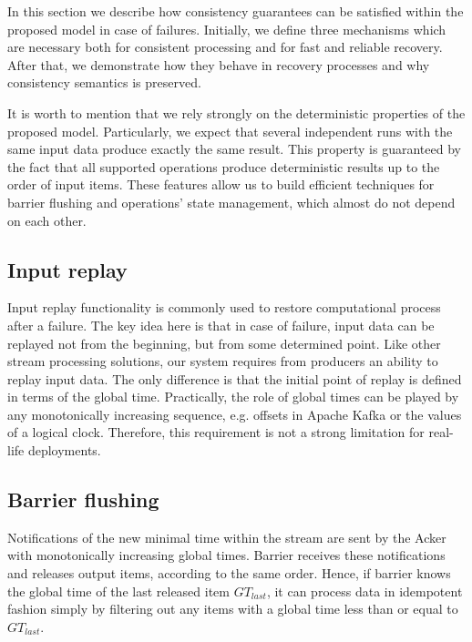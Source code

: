 
\label {fs-consistency-seciton}

In this section we describe how consistency guarantees can be satisfied within the proposed model in case of failures. Initially, we define three mechanisms which are necessary both for consistent processing and for fast and reliable recovery. After that, we demonstrate how they behave in recovery processes and why consistency semantics is preserved.

It is worth to mention that we rely strongly on the deterministic properties of the proposed model. Particularly, we expect that several independent runs with the same input data produce exactly the same result. This property is guaranteed by the fact that all supported operations produce deterministic results up to the order of input items. These features allow us to build efficient techniques for barrier flushing and operations' state management, which almost do not depend on each other.  

\subsection{Input replay}
Input replay functionality is commonly used to restore computational process after a failure. The key idea here is that in case of failure, input data can be replayed not from the beginning, but from some determined point. Like other stream processing solutions, our system requires from producers an ability to replay input data. The only difference is that the initial point of replay is defined in terms of the global time. Practically, the role of global times can be played by any monotonically increasing sequence, e.g. offsets in Apache Kafka or the values of a logical clock. Therefore, this requirement is not a strong limitation for real-life deployments.

\subsection{Barrier flushing}
Notifications of the new minimal time within the stream are sent by the Acker with monotonically increasing global times. Barrier receives these notifications and releases output items, according to the same order. Hence, if barrier knows the global time of the last released item $GT_{last}$, it can process data in idempotent fashion simply by filtering out any items with a global time less than or equal to $GT_{last}$. 

